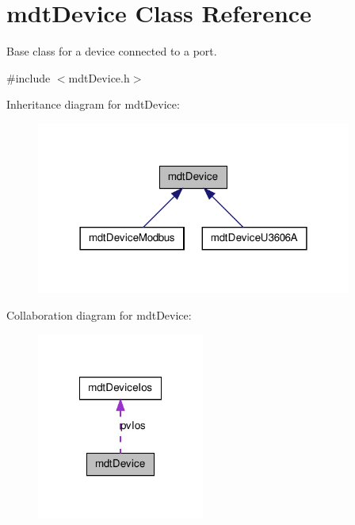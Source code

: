 \hypertarget{classmdt_device}{
\section{mdtDevice Class Reference}
\label{classmdt_device}
}


Base class for a device connected to a port.  




{\ttfamily \#include $<$mdtDevice.h$>$}



Inheritance diagram for mdtDevice:\nopagebreak
\begin{figure}[H]
\begin{center}
\leavevmode
\includegraphics[width=294pt]{classmdt_device__inherit__graph}
\end{center}
\end{figure}


Collaboration diagram for mdtDevice:\nopagebreak
\begin{figure}[H]
\begin{center}
\leavevmode
\includegraphics[width=156pt]{classmdt_device__coll__graph}
\end{center}
\end{figure}
